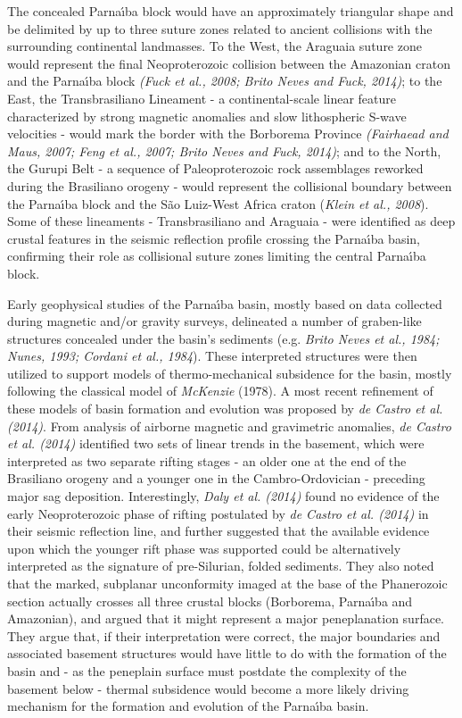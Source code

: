 \documentclass[manuscript,11pt]{geophysics}
\begin{document}
The concealed Parna\'{\i}ba block would have an approximately triangular shape and be delimited by up to three suture zones related to ancient collisions with the surrounding continental landmasses. To the West, the Araguaia suture zone would represent the final Neoproterozoic collision between the Amazonian craton and the Parna\'{\i}ba block \textit{(Fuck et al., 2008; Brito Neves and Fuck, 2014)}; to the East, the Transbrasiliano Lineament - a continental-scale linear feature characterized by strong magnetic anomalies and slow lithospheric S-wave velocities - would mark the border with the Borborema Province \textit{(Fairhaead and Maus, 2007; Feng et al., 2007; Brito Neves and Fuck, 2014)}; and to the North, the Gurupi Belt - a sequence of Paleoproterozoic rock assemblages reworked during the Brasiliano orogeny - would represent the collisional boundary between the Parna\'{\i}ba block and the S\~ao Luiz-West Africa craton (\textit{Klein et al., 2008}). Some of these lineaments - Transbrasiliano and Araguaia - were identified as deep crustal features in the seismic reflection profile crossing the Parna\'{\i}ba basin, confirming their role as collisional suture zones limiting the central Parna\'{\i}ba block.

Early geophysical studies of the Parna\'{\i}ba basin, mostly based on data collected during magnetic and/or gravity surveys, delineated a number of graben-like structures concealed under the basin's sediments (e.g. \textit{Brito Neves et al., 1984; Nunes, 1993; Cordani et al., 1984}). These interpreted structures were then utilized to support models of thermo-mechanical subsidence for the basin, mostly following the classical model of \textit{McKenzie} (1978). A most recent refinement of these models of basin formation and evolution was proposed by \textit{de Castro et al. (2014)}. From analysis of airborne magnetic and gravimetric anomalies, \textit{de Castro et al. (2014)} identified two sets of linear trends in the basement, which were interpreted as two separate rifting stages - an older one at the end of the Brasiliano orogeny and a younger one in the Cambro-Ordovician - preceding major sag deposition. Interestingly, \textit{Daly et al. (2014)} found no evidence of the early Neoproterozoic phase of rifting postulated by \textit{de Castro et al. (2014)} in their seismic reflection line, and further suggested that the available evidence upon which the younger rift phase was supported could be alternatively interpreted as the signature of pre-Silurian, folded sediments. They also noted that the marked, subplanar unconformity imaged at the base of the Phanerozoic section actually crosses all three crustal blocks (Borborema, Parna\'{\i}ba and Amazonian), and argued that it might represent a major peneplanation surface. They argue that, if their interpretation were correct, the major boundaries and associated basement structures would have little to do with the formation of the basin and - as the peneplain surface must postdate the complexity of the basement below - thermal subsidence would become a more likely driving mechanism for the formation and evolution of the Parna\'{\i}ba basin.
\end{document}
